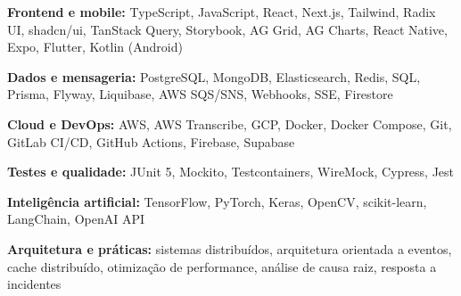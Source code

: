 \vspace{0.2 cm}

\begin{onecolentry}
    \textbf{Frontend e mobile:} TypeScript, JavaScript, React, Next.js, Tailwind, Radix UI, shadcn/ui, TanStack Query, Storybook, AG Grid, AG Charts, React Native, Expo, Flutter, Kotlin (Android)
\end{onecolentry}

\vspace{0.2 cm}

\begin{onecolentry}
    \textbf{Dados e mensageria:} PostgreSQL, MongoDB, Elasticsearch, Redis, SQL, Prisma, Flyway, Liquibase, AWS SQS/SNS, Webhooks, SSE, Firestore
\end{onecolentry}

\vspace{0.2 cm}

\begin{onecolentry}
    \textbf{Cloud e DevOps:} AWS, AWS Transcribe, GCP, Docker, Docker Compose, Git, GitLab CI/CD, GitHub Actions, Firebase, Supabase
\end{onecolentry}

\vspace{0.2 cm}

\begin{onecolentry}
    \textbf{Testes e qualidade:} JUnit 5, Mockito, Testcontainers, WireMock, Cypress, Jest
\end{onecolentry}

\vspace{0.2 cm}

\begin{onecolentry}
    \textbf{Inteligência artificial:} TensorFlow, PyTorch, Keras, OpenCV, scikit-learn, LangChain, OpenAI API
\end{onecolentry}

\vspace{0.2 cm}

\begin{onecolentry}
    \textbf{Arquitetura e práticas:} sistemas distribuídos, arquitetura orientada a eventos, cache distribuído, otimização de performance, análise de causa raiz, resposta a incidentes
\end{onecolentry}
